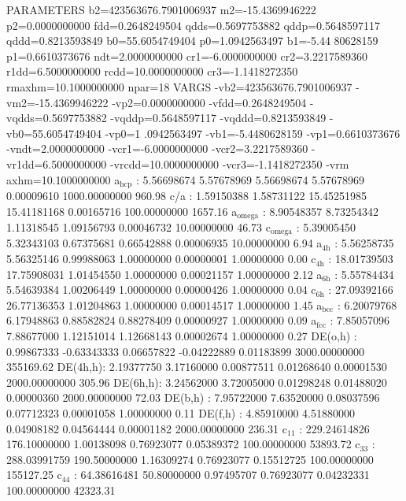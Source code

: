 \documentclass[11pt]{article}
\begin{document}
PARAMETERS
  b2=423563676.7901006937 m2=-15.4369946222 p2=0.0000000000 fdd=0.2648249504 qdds=0.5697753882 qddp=0.5648597117 qddd=0.8213593849 b0=55.6054749404 p0=1.0942563497 b1=-5.44
80628159 p1=0.6610373676 ndt=2.0000000000 cr1=-6.0000000000 cr2=3.2217589360 r1dd=6.5000000000 rcdd=10.0000000000 cr3=-1.1418272350 rmaxhm=10.1000000000 npar=18 
VARGS
    -vb2=423563676.7901006937 -vm2=-15.4369946222 -vp2=0.0000000000 -vfdd=0.2648249504 -vqdds=0.5697753882 -vqddp=0.5648597117 -vqddd=0.8213593849 -vb0=55.6054749404 -vp0=1
.0942563497 -vb1=-5.4480628159 -vp1=0.6610373676 -vndt=2.0000000000 -vcr1=-6.0000000000 -vcr2=3.2217589360 -vr1dd=6.5000000000 -vrcdd=10.0000000000 -vcr3=-1.1418272350 -vrm
axhm=10.1000000000
 a\(_{\text{hcp}}\)   :   5.56698674   5.57678969   5.56698674   5.57678969   0.00009610 1000.00000000       960.98
 c/a     :   1.59150388   1.58731122  15.45251985  15.41181168   0.00165716 100.00000000      1657.16
 a\(_{\text{omega}}\) :   8.90548357   8.73254342   1.11318545   1.09156793   0.00046732  10.00000000        46.73
 c\(_{\text{omega}}\) :   5.39005450   5.32343103   0.67375681   0.66542888   0.00006935  10.00000000         6.94
 a\(_{\text{4h}}\)    :   5.56258735   5.56325146   0.99988063   1.00000000   0.00000001   1.00000000         0.00
 c\(_{\text{4h}}\)    :  18.01739503  17.75908031   1.01454550   1.00000000   0.00021157   1.00000000         2.12
 a\(_{\text{6h}}\)    :   5.55784434   5.54639384   1.00206449   1.00000000   0.00000426   1.00000000         0.04
 c\(_{\text{6h}}\)    :  27.09392166  26.77136353   1.01204863   1.00000000   0.00014517   1.00000000         1.45
 a\(_{\text{bcc}}\)   :   6.20079768   6.17948863   0.88582824   0.88278409   0.00000927   1.00000000         0.09
 a\(_{\text{fcc}}\)   :   7.85057096   7.88677000   1.12151014   1.12668143   0.00002674   1.00000000         0.27
 DE(o,h) :   0.99867333  -0.63343333   0.06657822  -0.04222889   0.01183899 3000.00000000    355169.62
 DE(4h,h):   2.19377750   3.17160000   0.00877511   0.01268640   0.00001530 2000.00000000       305.96
 DE(6h,h):   3.24562000   3.72005000   0.01298248   0.01488020   0.00000360 2000.00000000        72.03
 DE(b,h) :   7.95722000   7.63520000   0.08037596   0.07712323   0.00001058   1.00000000         0.11
 DE(f,h) :   4.85910000   4.51880000   0.04908182   0.04564444   0.00001182 2000.00000000       236.31
 c\(_{\text{11}}\)    : 229.24614826 176.10000000   1.00138098   0.76923077   0.05389372 100.00000000     53893.72
 c\(_{\text{33}}\)    : 288.03991759 190.50000000   1.16309274   0.76923077   0.15512725 100.00000000    155127.25
 c\(_{\text{44}}\)    :  64.38616481  50.80000000   0.97495707   0.76923077   0.04232331 100.00000000     42323.31
\end{document}
